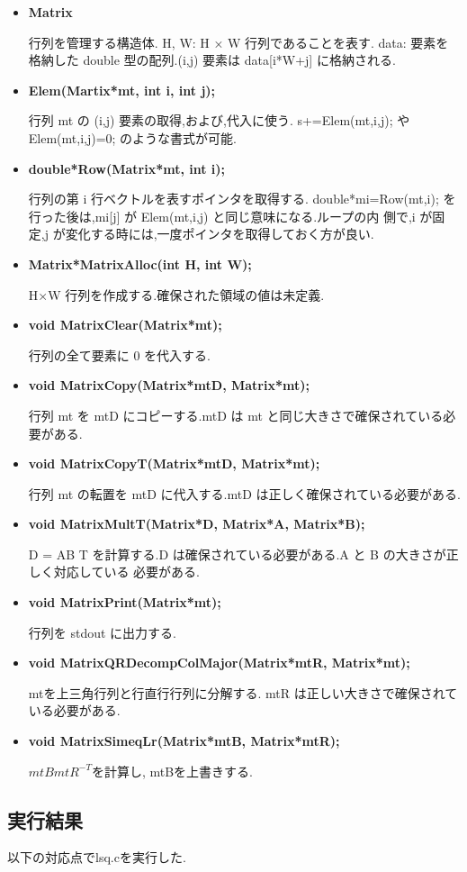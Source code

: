 \documentclass[a4j]{jarticle}
\begin{document}
\begin{itemize}

\item {\bf Matrix}

  行列を管理する構造体.
  H, W: H × W 行列であることを表す.
  data: 要素を格納した double 型の配列.(i,j) 要素は data[i*W+j] に格納される.
\item {\bf Elem(Martix*mt, int i, int j);}

  行列 mt の (i,j) 要素の取得,および,代入に使う.
  s+=Elem(mt,i,j); や Elem(mt,i,j)=0; のような書式が可能.
\item {\bf double*Row(Matrix*mt, int i);}

  行列の第 i 行ベクトルを表すポインタを取得する.
  double*mi=Row(mt,i); を行った後は,mi[j] が Elem(mt,i,j) と同じ意味になる.ループの内
  側で,i が固定,j が変化する時には,一度ポインタを取得しておく方が良い.
\item {\bf Matrix*MatrixAlloc(int H, int W);}

  H×W 行列を作成する.確保された領域の値は未定義.
\item {\bf void MatrixClear(Matrix*mt);}

  行列の全て要素に 0 を代入する.
\item {\bf void MatrixCopy(Matrix*mtD, Matrix*mt);}
  
  行列 mt を mtD にコピーする.mtD は mt と同じ大きさで確保されている必要がある.
\item {\bf void MatrixCopyT(Matrix*mtD, Matrix*mt);}

  行列 mt の転置を mtD に代入する.mtD は正しく確保されている必要がある.
\item {\bf void MatrixMultT(Matrix*D, Matrix*A, Matrix*B);}

  D = AB T を計算する.D は確保されている必要がある.A と B の大きさが正しく対応している
  必要がある.
\item {\bf void MatrixPrint(Matrix*mt);}

  行列を stdout に出力する.
\item {\bf void MatrixQRDecompColMajor(Matrix*mtR, Matrix*mt);}

  mtを上三角行列と行直行行列に分解する.
  mtR は正しい大きさで確保されている必要がある.
\item {\bf void MatrixSimeqLr(Matrix*mtB, Matrix*mtR);}
  
  $mtBmtR^{-T}$を計算し, mtBを上書きする.
\end{itemize}

\subsection{実行結果}
以下の対応点でlsq.cを実行した.
\end{document}
